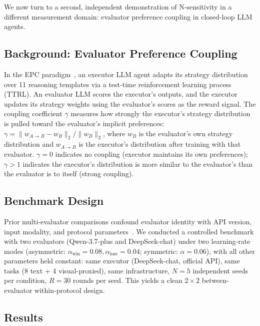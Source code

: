 \documentclass[11pt]{article}
\begin{document}
We now turn to a second, independent demonstration of N-sensitivity in a different measurement domain: evaluator preference coupling in closed-loop LLM agents.

\subsection{Background: Evaluator Preference Coupling}

In the EPC paradigm~\cite{liu2026mmepc}, an executor LLM agent adapts its strategy distribution over 11 reasoning templates via a test-time reinforcement learning process (TTRL). An evaluator LLM scores the executor's outputs, and the executor updates its strategy weights using the evaluator's scores as the reward signal. The coupling coefficient $\gamma$ measures how strongly the executor's strategy distribution is pulled toward the evaluator's implicit preferences: $\gamma = \|w_{A\to B} - w_B\|_2 / \|w_B\|_2$, where $w_B$ is the evaluator's own strategy distribution and $w_{A\to B}$ is the executor's distribution after training with that evaluator. $\gamma = 0$ indicates no coupling (executor maintains its own preferences); $\gamma > 1$ indicates the executor's distribution is more similar to the evaluator's than the evaluator is to itself (strong coupling).

\subsection{Benchmark Design}

Prior multi-evaluator comparisons confound evaluator identity with API version, input modality, and protocol parameters~\cite{liu2026mmepc}. We conducted a controlled benchmark with two evaluators (Qwen-3.7-plus and DeepSeek-chat) under two learning-rate modes (asymmetric: $\alpha_{\text{win}}{=}0.08, \alpha_{\text{lose}}{=}0.04$; symmetric: $\alpha{=}0.06$), with all other parameters held constant: same executor (DeepSeek-chat, official API), same tasks (8 text + 4 visual-proxied), same infrastructure, $N{=}5$ independent seeds per condition, $R{=}30$ rounds per seed. This yields a clean $2 \times 2$ between-evaluator within-protocol design.

\subsection{Results}
\end{document}
